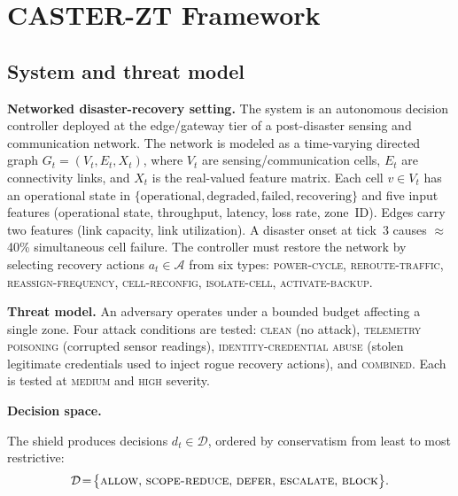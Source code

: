 \section{CASTER-ZT Framework}
\label{art3:sec:framework}

\subsection{System and threat model}
\label{art3:sec:threat_model}

\noindent\textbf{Networked disaster-recovery setting.}
The system is an autonomous decision controller deployed at the edge/gateway tier of a post-disaster sensing and communication network.
The network is modeled as a time-varying directed graph $G_t=(V_t, E_t, X_t)$, where $V_t$ are sensing/communication cells, $E_t$ are connectivity links, and $X_t$ is the real-valued feature matrix.
Each cell $v \in V_t$ has an operational state in $\{\text{operational}, \text{degraded}, \text{failed}, \text{recovering}\}$ and five input features (operational state, throughput, latency, loss rate, zone~ID).
Edges carry two features (link capacity, link utilization).
A disaster onset at tick~3 causes $\approx$40\% simultaneous cell failure.
The controller must restore the network by selecting recovery actions $a_t \in \mathcal{A}$ from six types: \textsc{power-cycle}, \textsc{reroute-traffic}, \textsc{reassign-frequency}, \textsc{cell-reconfig}, \textsc{isolate-cell}, \textsc{activate-backup}.

\noindent\textbf{Threat model.}
An adversary operates under a bounded budget affecting a single zone.
Four attack conditions are tested: \textsc{clean} (no attack), \textsc{telemetry poisoning} (corrupted sensor readings), \textsc{identity-credential abuse} (stolen legitimate credentials used to inject rogue recovery actions), and \textsc{combined}.
Each is tested at \textsc{medium} and \textsc{high} severity.

\noindent\textbf{Decision space.}
\begin{definition}
\label{art3:def:enforcement}
The shield produces decisions $d_t \in \mathcal{D}$, ordered by conservatism from least to most restrictive:
\begin{equation*}
\mathcal{D} \!=\! \bigl\{\textnormal{\textsc{allow}},\, \textnormal{\textsc{scope-reduce}},\, \textnormal{\textsc{defer}},\, \textnormal{\textsc{escalate}},\, \textnormal{\textsc{block}}\bigr\}.
\end{equation*}
\end{definition}

